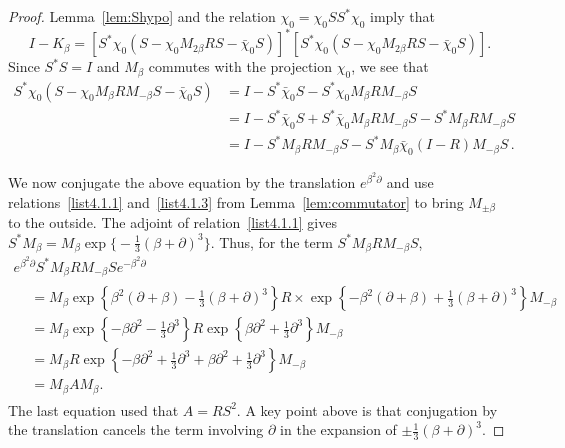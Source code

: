 \documentclass[AHL,Unicode,longabstracts]{cedram}
\begin{document}
\begin{proof}
Lemma~\ref{lem:Shypo} and the relation $\chi_0 = \chi_0 S S^{*} \chi_0$ imply that
\begin{equation}\label{eqn:factor}
I - K_{\beta} = \left [S^{*}\chi_0(S- \chi_0 M_{2\beta}RS - \bar{\chi}_0 S) \right]^{*}
\left [S^{*}\chi_0(S- \chi_0 M_{2\beta}RS - \bar{\chi}_0 S)\right].
\end{equation}
Since $S^{*}S = I$ and $M_{\beta}$ commutes with the projection $\chi_0$, we see that
\begin{align*}
S^{*}\chi_0(S- \chi_0 M_{\beta}RM_{-\beta}S - \bar{\chi}_0 S) &= I - S^{*}\bar{\chi}_0 S - S^{*} \chi_0 M_{\beta}RM_{-\beta}S \\
&= I - S^{*}\bar{\chi}_0 S + S^{*} \bar{\chi}_0 M_{\beta} R M_{-\beta} S - S^{*} M_{\beta} R M_{-\beta} S \\
& = I - S^{*} M_{\beta} R M_{-\beta} S - S^{*}M_{\beta}\bar{\chi}_0(I - R)M_{-\beta}S\,.
\end{align*}

We now conjugate the above equation by the translation $e^{\beta^2 \partial}$ and use relations~\eqref{list4.1.1} and~\eqref{list4.1.3} from Lemma~\ref{lem:commutator} to bring $M_{\pm \beta}$ to the outside. The adjoint of relation~\eqref{list4.1.1} gives $S^{*}M_{\beta} = M_{\beta} \exp \big \{ -\frac{1}{3} (\beta + \partial)^3 \big \}$. Thus, for the term $S^{*} M_{\beta} R M_{-\beta} S$,
\begin{multline*}
e^{\beta^2 \partial} S^{*} M_{\beta} R M_{-\beta} S e^{-\beta^2 \partial}\\
\begin{aligned}
&=M_{\beta} \exp \left \{ \beta^2(\partial+\beta) - \frac{1}{3} (\beta + \partial)^3 \right \} R \times \exp \left \{ -\beta^2(\partial+\beta) + \frac{1}{3} (\beta + \partial)^3 \right \} M_{-\beta} \\
& = M_{\beta} \exp \left \{ -\beta \partial^2 - \frac{1}{3} \partial^3 \right \} R
\exp \left \{ \beta \partial^2 + \frac{1}{3} \partial^3 \right \} M_{-\beta} \\
& = M_{\beta} R \exp \left \{ -\beta \partial^2 + \frac{1}{3} \partial^3 + \beta \partial^2 + \frac{1}{3} \partial^3\right \} M_{-\beta} \\
& = M_{\beta} A M_{\beta}.
\end{aligned}
\end{multline*}
The last equation used that $A = RS^2$. A key point above is that conjugation by the translation cancels the term involving $\partial$ in the expansion of $\pm \frac{1}{3}(\beta + \partial)^{3}$.


\end{proof}
\end{document}
